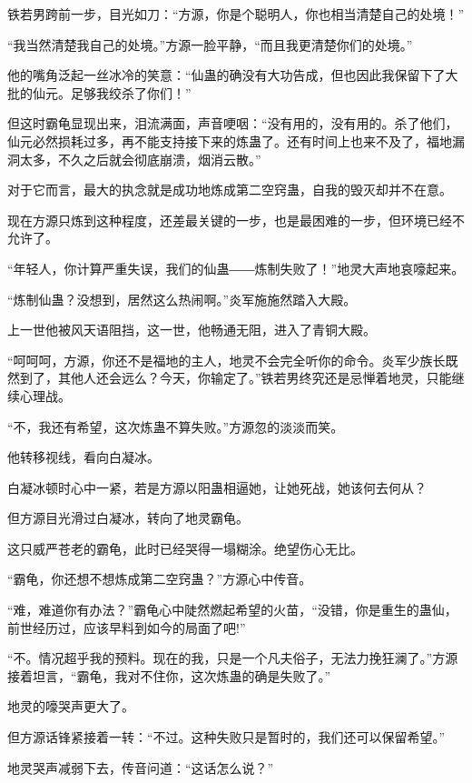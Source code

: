 
\begin{this_body}

铁若男跨前一步，目光如刀：“方源，你是个聪明人，你也相当清楚自己的处境！”

“我当然清楚我自己的处境。”方源一脸平静，“而且我更清楚你们的处境。”

他的嘴角泛起一丝冰冷的笑意：“仙蛊的确没有大功告成，但也因此我保留下了大批的仙元。足够我绞杀了你们！”

但这时霸龟显现出来，泪流满面，声音哽咽：“没有用的，没有用的。杀了他们，仙元必然损耗过多，再不能支持接下来的炼蛊了。还有时间上也来不及了，福地漏洞太多，不久之后就会彻底崩溃，烟消云散。”

对于它而言，最大的执念就是成功地炼成第二空窍蛊，自我的毁灭却并不在意。

现在方源只炼到这种程度，还差最关键的一步，也是最困难的一步，但环境已经不允许了。

“年轻人，你计算严重失误，我们的仙蛊――炼制失败了！”地灵大声地哀嚎起来。

“炼制仙蛊？没想到，居然这么热闹啊。”炎军施施然踏入大殿。

上一世他被风天语阻挡，这一世，他畅通无阻，进入了青铜大殿。

“呵呵呵，方源，你还不是福地的主人，地灵不会完全听你的命令。炎军少族长既然到了，其他人还会远么？今天，你输定了。”铁若男终究还是忌惮着地灵，只能继续心理战。

“不，我还有希望，这次炼蛊不算失败。”方源忽的淡淡而笑。

他转移视线，看向白凝冰。

白凝冰顿时心中一紧，若是方源以阳蛊相逼她，让她死战，她该何去何从？

但方源目光滑过白凝冰，转向了地灵霸龟。

这只威严苍老的霸龟，此时已经哭得一塌糊涂。绝望伤心无比。

“霸龟，你还想不想炼成第二空窍蛊？”方源心中传音。

“难，难道你有办法？”霸龟心中陡然燃起希望的火苗，“没错，你是重生的蛊仙，前世经历过，应该早料到如今的局面了吧!”

“不。情况超乎我的预料。现在的我，只是一个凡夫俗子，无法力挽狂澜了。”方源接着坦言，“霸龟，我对不住你，这次炼蛊的确是失败了。”

地灵的嚎哭声更大了。

但方源话锋紧接着一转：“不过。这种失败只是暂时的，我们还可以保留希望。”

地灵哭声减弱下去，传音问道：“这话怎么说？”


\end{this_body}

